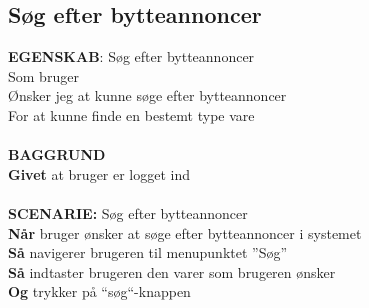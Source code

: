 \subsection{Søg efter bytteannoncer}
{\color{blue}\textbf{EGENSKAB}:} Søg efter bytteannoncer \\
Som bruger \\
Ønsker jeg at kunne søge efter bytteannoncer \\
For at kunne finde en bestemt type vare\\ \\
{\color{blue}\textbf{BAGGRUND}} \\
{\color{blue}\textbf{Givet}} at bruger er logget ind \\
\\
{\color{blue}\textbf{SCENARIE:}} Søg efter bytteannoncer \\
{\color{blue}\textbf{Når}} bruger ønsker at søge efter bytteannoncer i systemet\\
{\color{blue}\textbf{Så}} navigerer brugeren til menupunktet ”Søg” \\
{\color{blue}\textbf{Så}} indtaster brugeren den varer som brugeren ønsker\\
{\color{blue}\textbf{Og}} trykker på “søg“-knappen
